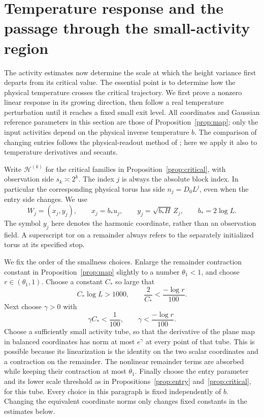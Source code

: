 \section{Temperature response and the passage through the small-activity region}
\label{sec:trajectory}

The activity estimates now determine the scale at which the height
variance first departs from its critical value.  The essential point is
to determine how the physical temperature crosses the critical
trajectory.  We first prove a nonzero linear response in its growing
direction, then follow a real temperature perturbation until it reaches
a fixed small exit level.  All coordinates and Gaussian reference
parameters in this section are those of Proposition~\ref{prop:map};
only the input activities depend on the physical inverse temperature
\(b\).  The comparison of changing entries follows the physical-readout
method of \cite[Lemma~5.7 and the proof of Proposition~5.1]{F};
here we apply it also to temperature derivatives and secants.

Write \(\mathcal H^{(k)}\) for the critical families in
Proposition~\ref{prop:critical}, with observation side
\(s_k\asymp2^k\).  The index \(j\) is always the absolute block index.
In particular the corresponding physical torus has side
\(n_j=D_0L^j\), even when the entry side changes.  We use
\[
 W_j=(x_j,y_j),\qquad
 x_j=b_*u_j,\qquad y_j=\sqrt{b_*H}\,Z_j,
 \qquad b_*=2\log L.
\]
The symbol \(y_j\) here denotes the harmonic coordinate, rather than
an observation field.  A superscript \(\mathrm{tor}\) on a remainder
always refers to the separately initialized torus at its specified
stop.

We fix the order of the smallness choices.  Enlarge the remainder
contraction constant in Proposition~\ref{prop:map} slightly to a
number \(\theta_1<1\), and choose \(r\in(\theta_1,1)\).  Choose a
constant \(C_*\) so large that
\begin{equation}\label{eq:traj-parameter-choice}
 C_*\log L>1000,\qquad
 \frac2{C_*}<\frac{-\log r}{100}.
\end{equation}
Next choose \(\gamma>0\) with
\[
 \gamma C_*<\frac1{100},\qquad
 \gamma<\frac{-\log r}{100}.
\]
Choose a sufficiently small activity tube, so that the derivative of
the plane map in balanced coordinates has norm at most
\(e^\gamma\) at every point of that tube.  This is possible because
its linearization is the identity on the two scalar coordinates and
a contraction on the remainder.  The nonlinear remainder terms are
absorbed while keeping their contraction at most \(\theta_1\).
Finally choose the entry parameter and its lower scale threshold as
in Propositions~\ref{prop:entry} and~\ref{prop:critical}, for this
tube.  Every choice in this paragraph is fixed independently of
\(b\).  Changing the equivalent coordinate norms only changes fixed
constants in the estimates below.


